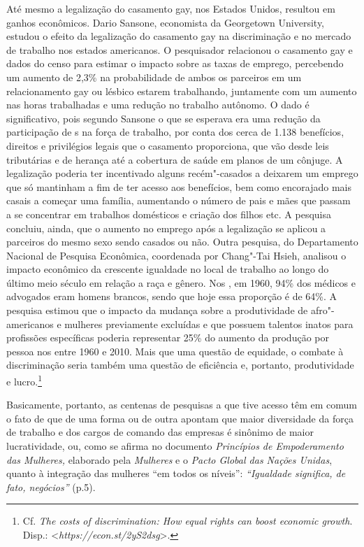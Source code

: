 Até mesmo a legalização do casamento gay, nos Estados Unidos, resultou
em ganhos econômicos. Dario Sansone, economista da Georgetown
University, estudou o efeito da legalização do casamento gay na
discriminação e no mercado de trabalho nos estados americanos. O
pesquisador relacionou o casamento gay e dados do censo para estimar o
impacto sobre as taxas de emprego, percebendo um aumento de 2,3\% na
probabilidade de ambos os parceiros em um relacionamento gay ou lésbico
estarem trabalhando, juntamente com um aumento nas horas trabalhadas e
uma redução no trabalho autônomo. O dado é significativo, pois segundo
Sansone o que se esperava era uma redução da participação de s na
força de trabalho, por conta dos cerca de 1.138 benefícios, direitos e
privilégios legais que o casamento proporciona, que vão desde leis
tributárias e de herança até a cobertura de saúde em planos de um
cônjuge. A legalização poderia ter incentivado alguns recém"-casados ​​a
deixarem um emprego que só mantinham a fim de ter acesso aos benefícios,
bem como encorajado mais casais a começar uma família, aumentando o
número de pais e mães que passam a se concentrar em trabalhos domésticos
e criação dos filhos etc. A pesquisa concluiu, ainda, que o aumento no
emprego após a legalização se aplicou a parceiros do mesmo sexo sendo
casados ​ou não. Outra pesquisa, do Departamento Nacional de Pesquisa
Econômica, coordenada por Chang"-Tai Hsieh, analisou o impacto econômico
da crescente igualdade no local de trabalho ao longo do último meio
século em relação a raça e gênero. Nos , em 1960, 94\% dos médicos e
advogados eram homens brancos, sendo que hoje essa proporção é de 64\%.
A pesquisa estimou que o impacto da mudança sobre a produtividade de
afro"-americanos e mulheres previamente excluídas e que possuem talentos
inatos para profissões específicas poderia representar 25\% do aumento
da produção por pessoa nos  entre 1960 e 2010. Mais que uma questão
de equidade, o combate à discriminação seria também uma questão de
eficiência e, portanto, produtividade e lucro.\footnote{Cf. \emph{The
  costs of discrimination: How equal rights can boost economic growth}.
  Disp.: \textless{}\emph{https://econ.st/2yS2dsg}\textgreater{}.}

Basicamente, portanto, as centenas de pesquisas a que tive acesso têm em
comum o fato de que de uma forma ou de outra apontam que maior
diversidade da força de trabalho e dos cargos de comando das empresas é
sinônimo de maior lucratividade, ou, como se afirma no documento
\emph{Princípios de Empoderamento das Mulheres,} elaborado pela
\emph{ Mulheres} e o \emph{Pacto Global das Nações Unidas}, quanto à
integração das mulheres ``em todos os níveis'': \emph{``Igualdade
significa, de fato, negócios''} (p.5).

